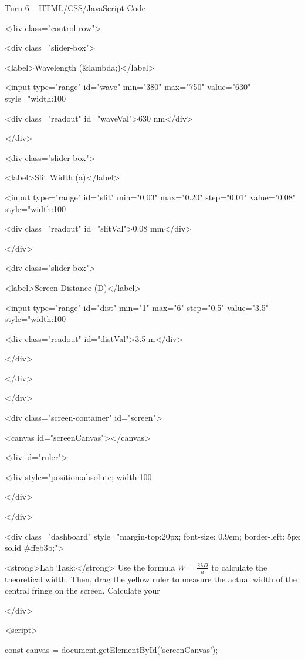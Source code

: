 \documentclass[10pt,a4paper]{article}
\begin{document}
\begin{htmlcodebox}{Turn 6 -- HTML/CSS/JavaScript Code}
{{{{    <div class="control-row">

        <div class="slider-box">

            <label>Wavelength (&lambda;)</label>

            <input type="range" id="wave" min="380" max="750" value="630" style="width:100%

            <div class="readout" id="waveVal">630 nm</div>

        </div>

        <div class="slider-box">

            <label>Slit Width (a)</label>

            <input type="range" id="slit" min="0.03" max="0.20" step="0.01" value="0.08" style="width:100%


            <div class="readout" id="slitVal">0.08 mm</div>

        </div>

        <div class="slider-box">

            <label>Screen Distance (D)</label>

            <input type="range" id="dist" min="1" max="6" step="0.5" value="3.5" style="width:100%

            <div class="readout" id="distVal">3.5 m</div>

        </div>

    </div>

</div>

<div class="screen-container" id="screen">

    <canvas id="screenCanvas"></canvas>

    <div id="ruler">

        <div style="position:absolute; width:100%

        </div>

</div>

<div class="dashboard" style="margin-top:20px; font-size: 0.9em; border-left: 5px solid #ffeb3b;">

    <strong>Lab Task:</strong> Use the formula \(W = \frac{2 \lambda D}{a}\) to calculate the theoretical width. Then, drag the yellow ruler to measure the actual width of the central fringe on the screen. Calculate your %

</div>

<script>

const canvas = document.getElementById('screenCanvas');

}}}}
\end{htmlcodebox}
\end{document}

